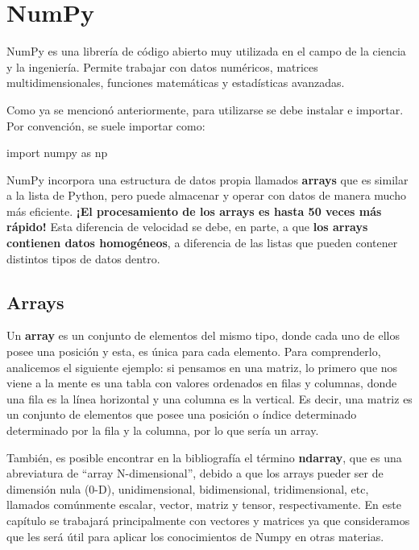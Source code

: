 \documentclass[
  letterpaper,
  DIV=11,
  numbers=noendperiod]{scrreprt}
\newenvironment{Shaded}{\begin{snugshade}}{\end{snugshade}}
\newcommand{\ImportTok}[1]{\textcolor[rgb]{0.00,0.46,0.62}{#1}}
\newcommand{\NormalTok}[1]{\textcolor[rgb]{0.00,0.23,0.31}{#1}}
\begin{document}
\section{NumPy}\label{numpy}

NumPy es una librería de código abierto muy utilizada en el campo de la
ciencia y la ingeniería. Permite trabajar con datos numéricos, matrices
multidimensionales, funciones matemáticas y estadísticas avanzadas.

Como ya se mencionó anteriormente, para utilizarse se debe instalar e
importar. Por convención, se suele importar como:

\begin{Shaded}
\begin{Highlighting}[]
\ImportTok{import}\NormalTok{ numpy }\ImportTok{as}\NormalTok{ np}
\end{Highlighting}
\end{Shaded}

NumPy incorpora una estructura de datos propia llamados \textbf{arrays}
que es similar a la lista de Python, pero puede almacenar y operar con
datos de manera mucho más eficiente. \textbf{¡El procesamiento de los
arrays es hasta 50 veces más rápido!} Esta diferencia de velocidad se
debe, en parte, a que \textbf{los arrays contienen datos homogéneos}, a
diferencia de las listas que pueden contener distintos tipos de datos
dentro.

\subsection{\texorpdfstring{\textbf{Arrays}}{Arrays}}\label{arrays}

Un \textbf{array} es un conjunto de elementos del mismo tipo, donde cada
uno de ellos posee una posición y esta, es única para cada elemento.
Para comprenderlo, analicemos el siguiente ejemplo: si pensamos en una
matriz, lo primero que nos viene a la mente es una tabla con valores
ordenados en filas y columnas, donde una fila es la línea horizontal y
una columna es la vertical. Es decir, una matriz es un conjunto de
elementos que posee una posición o índice determinado determinado por la
fila y la columna, por lo que sería un array.

También, es posible encontrar en la bibliografía el término
\textbf{ndarray}, que es una abreviatura de ``array N-dimensional'',
debido a que los arrays pueder ser de dimensión nula (0-D),
unidimensional, bidimensional, tridimensional, etc, llamados comúnmente
escalar, vector, matriz y tensor, respectivamente. En este capítulo se
trabajará principalmente con vectores y matrices ya que consideramos que
les será útil para aplicar los conocimientos de Numpy en otras materias.
\end{document}
